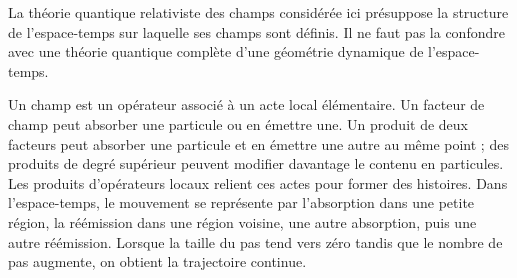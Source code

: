 \begin{classroomqa}
\end{classroomqa}

\begin{classroomqa}
\end{classroomqa}

La théorie quantique relativiste des champs considérée ici présuppose la structure de l’espace-temps sur laquelle ses champs sont définis. Il ne faut pas la confondre avec une théorie quantique complète d’une géométrie dynamique de l’espace-temps.

\begin{classroomqa}
\end{classroomqa}

Un champ est un opérateur associé à un acte local élémentaire. Un facteur de champ peut absorber une particule ou en émettre une. Un produit de deux facteurs peut absorber une particule et en émettre une autre au même point ; des produits de degré supérieur peuvent modifier davantage le contenu en particules. Les produits d’opérateurs locaux relient ces actes pour former des histoires. Dans l’espace-temps, le mouvement se représente par l’absorption dans une petite région, la réémission dans une région voisine, une autre absorption, puis une autre réémission. Lorsque la taille du pas tend vers zéro tandis que le nombre de pas augmente, on obtient la trajectoire continue.

